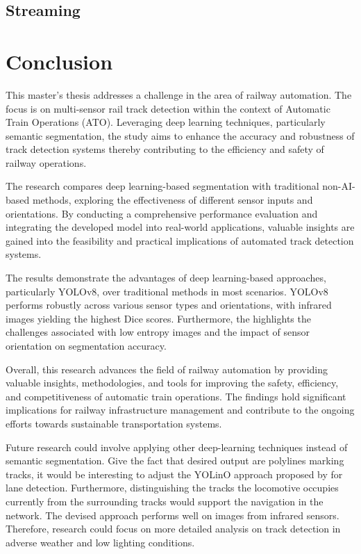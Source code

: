 \documentclass[Master,MDS,english]{BASE/twbook} %
\begin{document}
\section{Streaming}




\chapter{Conclusion} %

This master's thesis addresses a challenge in the area of railway automation. The focus is on multi-sensor rail track detection within the context of Automatic Train Operations (ATO). Leveraging deep learning techniques, particularly semantic segmentation, the study aims to enhance the accuracy and robustness of track detection systems thereby contributing to the efficiency and safety of railway operations.

The research compares deep learning-based segmentation with traditional non-AI-based methods, exploring the effectiveness of different sensor inputs and orientations. By conducting a comprehensive performance evaluation and integrating the developed model into real-world applications, valuable insights are gained into the feasibility and practical implications of automated track detection systems.

The results demonstrate the advantages of deep learning-based approaches, particularly YOLOv8, over traditional methods in most scenarios. YOLOv8 performs robustly across various sensor types and orientations, with infrared images yielding the highest Dice scores. Furthermore, the highlights the challenges associated with low entropy images and the impact of sensor orientation on segmentation accuracy.

Overall, this research advances the field of railway automation by providing valuable insights, methodologies, and tools for improving the safety, efficiency, and competitiveness of automatic train operations. The findings hold significant implications for railway infrastructure management and contribute to the ongoing efforts towards sustainable transportation systems.

Future research could involve applying other deep-learning techniques instead of semantic segmentation. Give the fact that desired output are polylines marking tracks, it would be interesting to adjust the YOLinO approach proposed by \cite{meyer2021yolino} for lane detection. Furthermore, distinguishing the tracks the locomotive occupies currently from the surrounding tracks would support the navigation in the network. 
The devised approach performs well on images from infrared sensors. Therefore, research could focus on more detailed analysis on track detection in adverse weather and low lighting conditions. 
\end{document}
